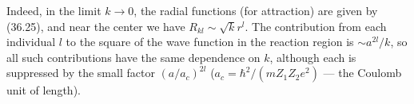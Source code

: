 Indeed, in the limit $k\to0$, the radial functions (for attraction) are given by (36.25), and near the center we have $R_{kl}\sim\sqrt{k}r^l$. The contribution from each individual $l$ to the square of the wave function in the reaction region is $\sim a^{2l}/k$, so all such contributions have the same dependence on $k$, although each is suppressed by the small factor $(a/a_c)^{2l}$ ($a_c=\hbar^2/(mZ_1Z_2e^2)$ --- the Coulomb unit of length).
